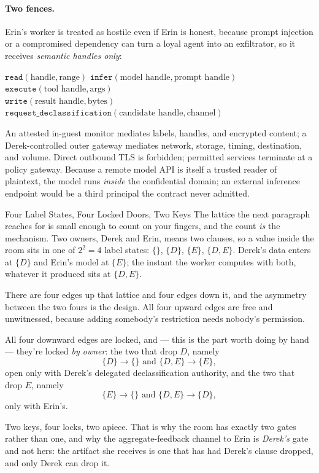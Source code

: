 \documentclass[11pt,a4paper]{article}
\theoremstyle{definition}
\begin{document}
\paragraph{Two fences.}
Erin's worker is treated as hostile even if Erin is honest, because prompt
injection or a compromised dependency can turn a loyal agent into an
exfiltrator, so it receives \emph{semantic handles only}:
\begin{center}\small
$\mathtt{read}(\text{handle},\text{range})$ \quad
$\mathtt{infer}(\text{model handle},\text{prompt handle})$ \quad
$\mathtt{execute}(\text{tool handle},\text{args})$\\[
2pt]
$\mathtt{write}(\text{result handle},\text{bytes})$ \quad
$\mathtt{request\_declassification}(\text{candidate handle},\text{channel})$
\end{center}
An attested in-guest monitor mediates labels, handles, and encrypted content; a
Derek-controlled outer gateway mediates network, storage, timing, destination,
and volume. Direct outbound TLS is forbidden; permitted services terminate at a
policy gateway. Because a remote model API is itself a trusted reader of
plaintext, the model runs \emph{inside} the confidential domain; an external
inference endpoint would be a third principal the contract never admitted.
\begin{pdexample}{Four Label States, Four Locked Doors, Two Keys}
\setlength{\parskip}{4pt plus 1pt}
The lattice the next paragraph reaches for is small enough to count on your
fingers, and the count \emph{is} the mechanism. Two owners, Derek and Erin,
means two clauses, so a value inside the room sits in one of $2^2=4$ label
states: $\{\}$, $\{D\}$, $\{E\}$, $\{D,E\}$. Derek's data enters at $\{D\}$ and
Erin's model at $\{E\}$; the instant the worker computes with both, whatever it
produced sits at $\{D,E\}$.

There are four edges up that lattice and four
edges down it, and the asymmetry between the two fours is the design. All four
upward edges are free and unwitnessed, because adding somebody's restriction
needs nobody's permission.

All four downward edges are locked, and --- this is
the part worth doing by hand --- they're locked \emph{by owner}: the two that
drop $D$, namely
\[
\{D\}\to\{\}\text{ and }\{D,E\}\to\{E\},
\]
open only with Derek's
delegated declassification authority, and the two that drop $E$, namely
\[
\{E\}\to\{\}\text{ and }\{D,E\}\to\{D\},
\]
only with Erin's.

Two keys, four locks,
two apiece. That is why the room has exactly two gates rather than one, and
why the aggregate-feedback channel to Erin is \emph{Derek's} gate and not hers:
the artifact she receives is one that has had Derek's clause dropped, and only
Derek can drop it.
\end{pdexample}
\end{document}
